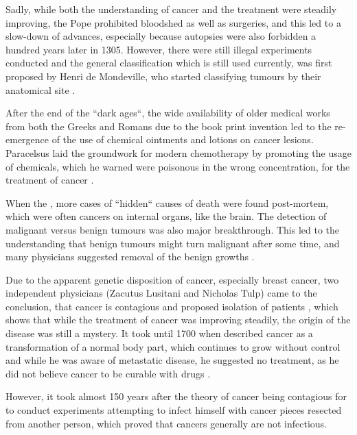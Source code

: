 Sadly, while both the understanding of cancer and the treatment were steadily improving, the Pope prohibited bloodshed as well as surgeries, and this led to a slow-down of advances, especially because autopsies were also forbidden a hundred years later in 1305. However, there were still illegal experiments conducted and the general classification which is still used currently, was first proposed by Henri de Mondeville, who started classifying tumours by their anatomical site \cite{Pilcher1895}.

After the end of the ``dark ages``, the wide availability of older medical works from both the Greeks and Romans due to the book print invention led to the re-emergence of the use of chemical ointments and lotions on cancer lesions. Paracelsus laid the groundwork for  modern chemotherapy by promoting the usage of chemicals, which he  warned were poisonous in the wrong concentration, for the treatment of cancer \cite{PHT1562}.

When the , more  cases of ``hidden`` causes of death were found post-mortem, which were often cancers on internal organs, like the brain. The detection of malignant versus benign tumours was also  major breakthrough. This led to the understanding that  benign tumours might turn malignant after some time, and many physicians suggested  removal of the benign growths \cite{Severino1632}.

Due to the apparent genetic disposition of cancer, especially breast cancer, two independent physicians (Zacutus Lusitani and Nicholas Tulp) came to the conclusion, that cancer is contagious and proposed  isolation of patients \cite{Lusitani1649,Tulpii1652}, which shows that while the treatment of cancer was improving steadily, the origin of the disease was still a mystery. It took until 1700 when \citeauthor{DeshaiesGendron1701} described cancer as a transformation of a normal body part, which continues to grow without control and while he was aware of metastatic disease, he suggested no treatment, as he did not believe cancer to be curable with drugs \cite{DeshaiesGendron1701}. 

However, it took almost 150 years after the theory of cancer being contagious for \textcite{Nooth1804} to conduct experiments attempting to infect himself with cancer pieces resected from another person, which proved that cancers generally are not infectious.

